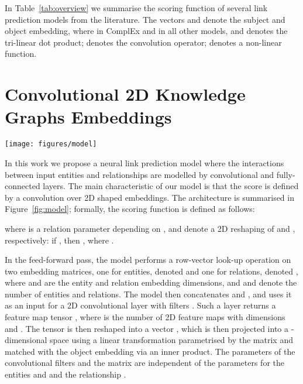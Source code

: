 \documentclass[letterpaper]{article}
\begin{document}
In Table~\ref{tab:overview} we summarise the scoring function of several link prediction models from the literature.
The vectors  and  denote the subject and object embedding, where  in ComplEx and  in all other models, and  denotes the tri-linear dot product;  denotes the convolution operator;  denotes a non-linear function.


\section{Convolutional 2D Knowledge Graphs Embeddings}


\begin{figure*}[ht]
	\caption{In the ConvE model, the entity and relation embeddings are first reshaped and concatenated (steps 1, 2); the resulting matrix is then used as input to a convolutional layer (step 3); the resulting feature map tensor is vectorised and projected into a -dimensional space (step 4) and matched with all candidate object embeddings (step 5).}
	\label{fig:model}
	\texttt{[image: figures/model]}
\end{figure*}

In this work we propose a neural link prediction model where the interactions between input entities and relationships are modelled by convolutional and fully-connected layers.
The main characteristic of our model is that the score is defined by a convolution over 2D shaped embeddings.
The architecture is summarised in Figure~\ref{fig:model}; formally, the scoring function is defined as follows:

\noindent where  is a relation parameter depending on ,  and  denote a 2D reshaping of  and , respectively: if , then , where .


In the feed-forward pass, the model performs a row-vector look-up operation on two embedding matrices, one for entities, denoted  and one for relations, denoted , where  and  are the entity and relation embedding dimensions, and  and  denote the number of entities and relations.
The model then concatenates  and , and uses it as an input for a 2D convolutional layer with filters .
Such a layer returns a feature map tensor , where  is the number of 2D feature maps with dimensions  and .
The tensor  is then reshaped into a vector , which is then projected into a -dimensional space using a linear transformation parametrised by the matrix  and matched with the object embedding  via an inner product.
The parameters of the convolutional filters and the matrix  are independent of the parameters for the entities  and  and the relationship .
\end{document}

